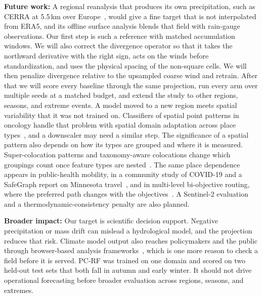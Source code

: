 \documentclass[sigconf,nonacm]{acmart}
\newcommand{\pcrf}{\textsc{PC-RF}\xspace}
\begin{document}
\textbf{Future work:} A regional reanalysis that produces its own precipitation, such as CERRA at 5.5\,km over Europe~\citep{ridal2024cerra}, would give a fine target that is not interpolated from ERA5, and its offline surface analysis blends that field with rain-gauge observations. Our first step is such a reference with matched accumulation windows. We will also correct the divergence operator so that it takes the northward derivative with the right sign, acts on the winds before standardization, and uses the physical spacing of the non-square cells. We will then penalize divergence relative to the upsampled coarse wind and retrain. After that we will score every baseline through the same projection, run every arm over multiple seeds at a matched budget, and extend the study to other regions, seasons, and extreme events. A model moved to a new region meets spatial variability that it was not trained on. Classifiers of spatial point patterns in oncology handle that problem with spatial domain adaptation across place types~\citep{farhadloo2024spatially,farhadloo2025spatially}, and a downscaler may need a similar step. The significance of a spatial pattern also depends on how its types are grouped and where it is measured. Super-colocation patterns and taxonomy-aware colocations change which groupings count once feature types are nested~\citep{an2025super,gupta2022taxonomy}. The same place dependence appears in public-health mobility, in a community study of {COVID-19} and a {SafeGraph} report on Minnesota travel~\citep{sharma2022covid,sharma2021safegraph}, and in multi-level bi-objective routing, where the preferred path changes with the objectives~\citep{yang2024routing}. A Sentinel-2 evaluation and a thermodynamic-consistency penalty are also planned.

\textbf{Broader impact:} Our target is scientific decision support. Negative precipitation or mass drift can mislead a hydrological model, and the projection reduces that risk. Climate model output also reaches policymakers and the public through browser-based analysis frameworks~\citep{sharma2018webglobe}, which is one more reason to check a field before it is served. \pcrf was trained on one domain and scored on two held-out test sets that both fall in autumn and early winter. It should not drive operational forecasting before broader evaluation across regions, seasons, and extremes.





\end{document}
